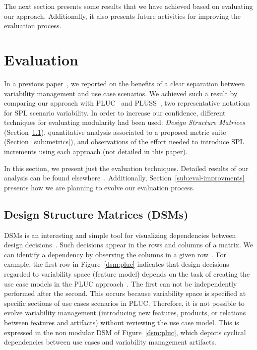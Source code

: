 \documentclass[times, 11pt,twocolumn]{article}
\begin{document}
The next section presents some results that we have achieved based on
evaluating our approach. Additionally, it also presents future activities for
improving the evaluation process.

\section{Evaluation}\label{sec:evaluation}

In a previous paper~\cite{Bonifacio:2008aa}, we reported on the benefits of a
clear separation between variability management and use case scenarios. We
achieved such a result by comparing our approach with
PLUC~\cite{Bertolino:2003aa} and PLUSS~\cite{Eriksson:2005aa}, two representative notations for SPL scenario
variability. In order to increase our confidence, different techniques for
evaluating modularity had been used: \emph{Design Structure Matrices} 
(Section~\ref{sub:dsm}), quantitative analysis associated to a proposed
metric suite (Section~\ref{sub:metrics}), and observations of the
effort needed to introduce SPL increments using each approach (not detailed in
this paper).

In this section, we present just the evaluation techniques.
Detailed results of our analysis can be found
elsewhere~\cite{Bonifacio:2008aa,Bonifacio:2008ab}. Additionally,
Section~\ref{sub:eval-improvments} presents how we are planning to evolve our evaluation
process.

\subsection{Design Structure Matrices (DSMs)}\label{sub:dsm}

DSMs is an interesting and simple tool for visualizing dependencies between
design decisions~\cite{Baldwin:2000aa}. Such decisions appear in the rows and
columns of a matrix. We can identify a dependency by observing the columns in a
given row~\cite{Baldwin:2000aa}. For example, the first row in
Figure~\ref{dsm:pluc} indicates that design decisions regarded to variability
space (feature model) depends on the task of creating the use case models in the
PLUC approach~\cite{Bertolino:2003aa}. The first can not be independently
performed after the second. This occurs because variability space is specified at
specific sections of use cases scenarios in PLUC. Therefore, it is not possible
to evolve variability management (introducing new features, products, or
relations between features and artifacts) without reviewing the use case model.
This is expressed in the non modular DSM of Figure~\ref{dsm:pluc}, which depicts
cyclical dependencies between use cases and variability management artifacts.
\end{document}
